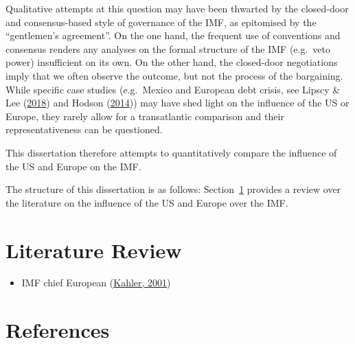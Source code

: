 \documentclass[
  letterpaper,
  abstract=true]{scrartcl}
\providecommand{\tightlist}{%
  \setlength{\itemsep}{0pt}\setlength{\parskip}{0pt}}\usepackage{longtable,booktabs,array}
\begin{document}
Qualitative attempts at this question may have been thwarted by the
closed-door and consensus-based style of governance of the IMF, as
epitomised by the ``gentlemen's agreement''. On the one hand, the
frequent use of conventions and consensus renders any analyses on the
formal structure of the IMF (e.g.~veto power) insufficient on its own.
On the other hand, the closed-door negotiations imply that we often
observe the outcome, but not the process of the bargaining. While
specific case studies (e.g.~Mexico and European debt crisis, see Lipscy
\& Lee (\protect\hyperlink{ref-lipscy2018}{2018}) and Hodson
(\protect\hyperlink{ref-hodson2014}{2014})) may have shed light on the
influence of the US or Europe, they rarely allow for a transatlantic
comparison and their representativeness can be questioned.

This dissertation therefore attempts to quantitatively compare the
influence of the US and Europe on the IMF.

The structure of this dissertation is as follows:
Section~\ref{sec-litreview} provides a review over the literature on the
influence of the US and Europe over the IMF.

\hypertarget{sec-litreview}{%
\section{Literature Review}\label{sec-litreview}}

\begin{itemize}
\tightlist
\item
  IMF chief European (\protect\hyperlink{ref-Kahler2001}{Kahler, 2001})
\end{itemize}

\hypertarget{references}{%
\section*{References}\label{references}}
\end{document}
